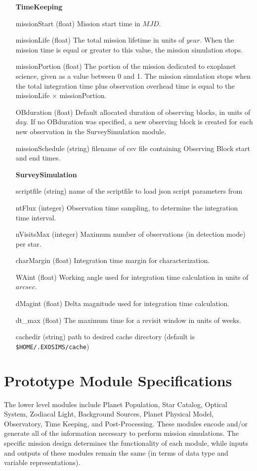 \documentclass[cleanfoot]{asme2ej}
\begin{document}
\begin{itemize}[leftmargin=1.5in,font={\ttfamily}]
\item[\textbf{TimeKeeping}]
\item[missionStart] (float) Mission start time in $ MJD $. 
\item[missionLife] (float) The total mission lifetime in units of $ year $.  When the mission time is equal or greater to this value, the mission simulation stops.
\item[missionPortion] (float) The portion of the mission dedicated to exoplanet science, given as a value between 0 and 1. The mission simulation stops when the total integration time plus observation overhead time is equal to the missionLife $\times$ missionPortion.
\item[OBduration] (float) Default allocated duration of observing blocks, in units of $day$. If no OBduration was specified, a new observing block is created for each new observation in the SurveySimulation module.
\item[missionSchedule] (string) filename of csv file containing Observing Block start and end times.

\item[\textbf{SurveySimulation}]
\item[scriptfile] (string) name of the scriptfile to load json script parameters from
\item[ntFlux] (integer) Observation time sampling, to determine the integration time interval.
\item[nVisitsMax] (integer) Maximum number of observations (in detection mode) per star. 
\item[charMargin] (float) Integration time margin for characterization. 
\item[WAint] (float) Working angle used for integration time calculation in units of $arcsec$.
\item[dMagint] (float) Delta magnitude used for integration time calculation.
\item[dt\_max] (float) The maximum time for a revisit window in units of weeks.
\item[cachedir] (string) path to desired cache directory (default is \texttt{\$HOME/.EXOSIMS/cache})


\end{itemize}

\section{Prototype Module Specifications}\label{sec:modules}
The lower level modules include Planet Population, Star Catalog, Optical System, Zodiacal Light, Background Sources, Planet Physical Model, Observatory, Time Keeping, and Post-Processing.  These modules encode and/or generate all of the information necessary to perform mission simulations.  The specific mission design determines the functionality of each module, while inputs and outputs of these modules remain the same (in terms of data type and variable representations).  
\end{document}
